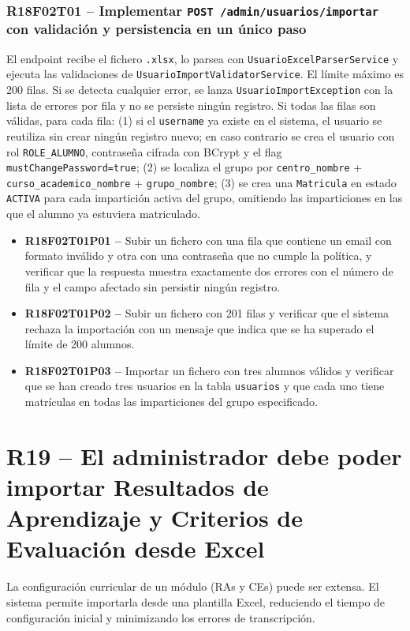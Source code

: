 \documentclass[12pt, a4paper]{report}
\begin{document}
\subsubsection{R18F02T01 -- Implementar \texttt{POST /admin/usuarios/importar} con validación y persistencia en un único paso}
El endpoint recibe el fichero \texttt{.xlsx}, lo parsea con \texttt{UsuarioExcelParserService} y ejecuta las validaciones de \texttt{UsuarioImportValidatorService}. El límite máximo es 200 filas. Si se detecta cualquier error, se lanza \texttt{UsuarioImportException} con la lista de errores por fila y no se persiste ningún registro. Si todas las filas son válidas, para cada fila: (1) si el \texttt{username} ya existe en el sistema, el usuario se reutiliza sin crear ningún registro nuevo; en caso contrario se crea el usuario con rol \texttt{ROLE\_ALUMNO}, contraseña cifrada con BCrypt y el flag \texttt{mustChangePassword=true}; (2) se localiza el grupo por \texttt{centro\_nombre} + \texttt{curso\_academico\_nombre} + \texttt{grupo\_nombre}; (3) se crea una \texttt{Matricula} en estado \texttt{ACTIVA} para cada impartición activa del grupo, omitiendo las imparticiones en las que el alumno ya estuviera matriculado.
\begin{itemize}
  \item \textbf{R18F02T01P01 --} Subir un fichero con una fila que contiene un email con formato inválido y otra con una contraseña que no cumple la política, y verificar que la respuesta muestra exactamente dos errores con el número de fila y el campo afectado sin persistir ningún registro.
  \item \textbf{R18F02T01P02 --} Subir un fichero con 201 filas y verificar que el sistema rechaza la importación con un mensaje que indica que se ha superado el límite de 200 alumnos.
  \item \textbf{R18F02T01P03 --} Importar un fichero con tres alumnos válidos y verificar que se han creado tres usuarios en la tabla \texttt{usuarios} y que cada uno tiene matrículas en todas las imparticiones del grupo especificado.
\end{itemize}

\section{R19 -- El administrador debe poder importar Resultados de Aprendizaje y Criterios de Evaluación desde Excel}

La configuración curricular de un módulo (RAs y CEs) puede ser extensa. El sistema permite importarla desde una plantilla Excel, reduciendo el tiempo de configuración inicial y minimizando los errores de transcripción.
\end{document}
